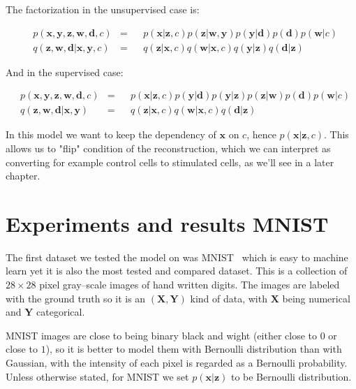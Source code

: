 \documentclass[11pt, a4paper]{report}
\theoremstyle{plain}
\theoremstyle{definition}
\theoremstyle{remark}
\newcommand{\X}{\mathbf{X}}
\newcommand{\x}{\mathbf{x}}
\newcommand{\z}{\mathbf{z}}
\newcommand{\Y}{\mathbf{Y}}
\newcommand{\y}{\mathbf{y}}
\newcommand{\w}{\mathbf{w}}
\newcommand{\dd}{\mathbf{d}}
\begin{document}
The factorization in the unsupervised case is:

\begin{equation}
\begin{aligned}
&p(\x, \y, \z, \w, \dd, c) &=& 
&p(\x | \z, c) p(\z | \w, \y) p(\y | \dd) p(\dd) p(\w | c) \\
&q(\z, \w, \dd | \x, \y, c) &=& 
&q(\z | \x, c) q(\w | \x, c) q(\y | \z) q(\dd | \z)
\label{eq:cgmmfact_unsupervised}
\end{aligned}
\end{equation}

And in the supervised case:

\begin{equation}
\begin{aligned}
&p(\x, \y, \z, \w, \dd, c) &=& 
&p(\x | \z, c) p(\y | \dd) p(\y | \z) p(\z | \w) p(\dd) p(\w | c) \\
&q(\z, \w, \dd | \x, \y) &=& 
&q(\z | \x, c) q(\w | \x, c) q(\dd | \z)
\label{eq:cgmmfact_supervised}
\end{aligned}
\end{equation}

In this model we want to keep the dependency of $\x$ on $c$, hence
$p(\x | \z, c)$. This allows us to "flip" condition of the reconstruction,
which we can interpret as converting for example control cells to stimulated
cells, as we'll see in a later chapter.


\chapter{Experiments and results MNIST}

The first dataset we tested the model on was MNIST~\cite{mnist} which is 
easy to machine learn yet it is also the most tested and compared dataset.
This is a collection of $28 \times 28$ pixel gray--scale images of hand written 
digits. The images are labeled with the ground truth so it is an $(\X,\Y)$ kind
of data, with $\X$ being numerical and $\Y$ categorical.

MNIST images are close to being binary black and wight (either close to $0$ or
close to $1$), so it is better to model them with Bernoulli distribution than
with Gaussian, with the intensity of each pixel is regarded as a Bernoulli
probability.
Unless otherwise stated, for MNIST we set $p(\x | \z)$ to be Bernoulli
distribution.
\end{document}
